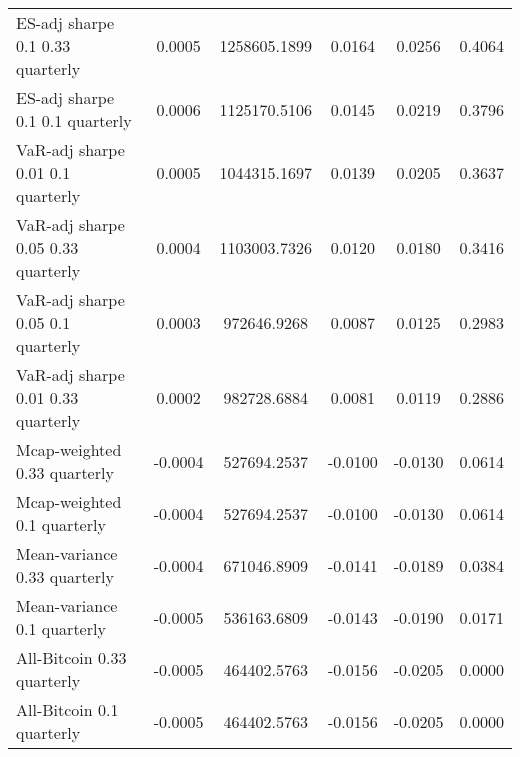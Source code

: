 \begin{tabular}{lccccc}
ES-adj sharpe 0.1 0.33 quarterly & 0.0005 & 1258605.1899 & 0.0164 & 0.0256 & 0.4064\\
ES-adj sharpe 0.1 0.1 quarterly & 0.0006 & 1125170.5106 & 0.0145 & 0.0219 & 0.3796\\
VaR-adj sharpe 0.01 0.1 quarterly & 0.0005 & 1044315.1697 & 0.0139 & 0.0205 & 0.3637\\
VaR-adj sharpe 0.05 0.33 quarterly & 0.0004 & 1103003.7326 & 0.0120 & 0.0180 & 0.3416\\
VaR-adj sharpe 0.05 0.1 quarterly & 0.0003 & 972646.9268 & 0.0087 & 0.0125 & 0.2983\\
VaR-adj sharpe 0.01 0.33 quarterly & 0.0002 & 982728.6884 & 0.0081 & 0.0119 & 0.2886\\
Mcap-weighted 0.33 quarterly & -0.0004 & 527694.2537 & -0.0100 & -0.0130 & 0.0614\\
Mcap-weighted 0.1 quarterly & -0.0004 & 527694.2537 & -0.0100 & -0.0130 & 0.0614\\
Mean-variance 0.33 quarterly & -0.0004 & 671046.8909 & -0.0141 & -0.0189 & 0.0384\\
Mean-variance 0.1 quarterly & -0.0005 & 536163.6809 & -0.0143 & -0.0190 & 0.0171\\
All-Bitcoin 0.33 quarterly & -0.0005 & 464402.5763 & -0.0156 & -0.0205 & 0.0000\\
All-Bitcoin 0.1 quarterly & -0.0005 & 464402.5763 & -0.0156 & -0.0205 & 0.0000\\
\bottomrule
\end{tabular}
